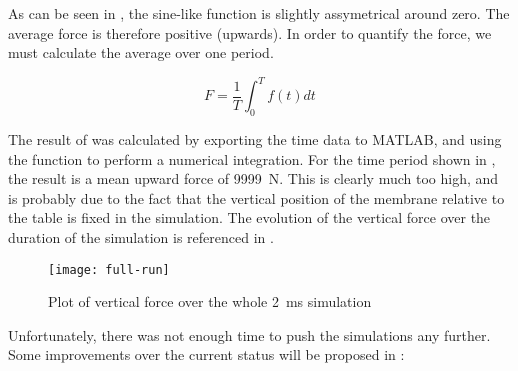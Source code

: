 As can be seen in , the sine-like function is slightly
assymetrical around zero. The average force is therefore positive (upwards).
In order to quantify the force, we must calculate the average over one period. 

\begin{equation}
  F = \frac{1}{T} \int_{0}^{T} f(t) dt
  \label{eq:force}
\end{equation}

The result of  was calculated by exporting the time data to MATLAB,
and using the  function to perform a numerical integration. For the
time period shown in , the result is a mean upward force of
\SI{9999}{\newton}.  %
This is clearly much too high, and is probably due to the fact that the vertical
position of the membrane relative to the table is fixed in the simulation. The
evolution of the vertical force over the duration of the simulation is
referenced in .

\begin{figure}[h]
  \begin{center}
    \texttt{[image: full-run]}
  \end{center}
  \caption{Plot of vertical force over the whole \SI{2}{\milli\second}
  simulation}
  \label{fig:full-run}
\end{figure}

Unfortunately, there was not enough time to push the simulations any further.
Some improvements over the current status will be proposed in
 : 
